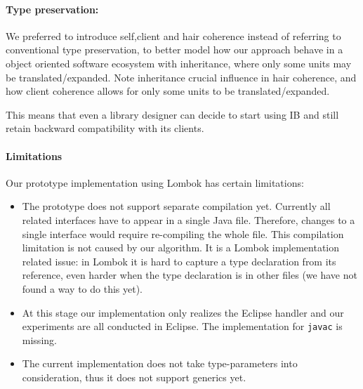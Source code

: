 \paragraph{Type preservation:}
We preferred to introduce self,client and hair coherence instead of referring to conventional 
type preservation,
to better model how our approach behave in a object oriented software ecosystem with inheritance,
where only some units may be translated/expanded.
Note inheritance crucial influence in hair coherence, and how client coherence allows 
for only some units to be translated/expanded.

This means that even a library designer can decide to start using IB and still 
retain backward compatibility with its clients.





\paragraph{Limitations}
Our prototype implementation using Lombok has certain limitations:
\begin{itemize}
\item The prototype does not support separate compilation yet. Currently all
  related interfaces have to appear in a single Java file. Therefore, changes to
  a single interface would require re-compiling the whole file. This compilation
  limitation is not caused by our algorithm. It is a Lombok implementation related
  issue: in Lombok it is hard to capture a type declaration from its reference,
  even harder when the type declaration is in other files (we have not found a
  way to do this yet).
\item At this stage our implementation only realizes the Eclipse handler and our
  experiments are all conducted in Eclipse. The implementation for
  \texttt{javac} is missing.
\item The current implementation does not take type-parameters into
  consideration, thus it does not support generics yet.
\end{itemize}

